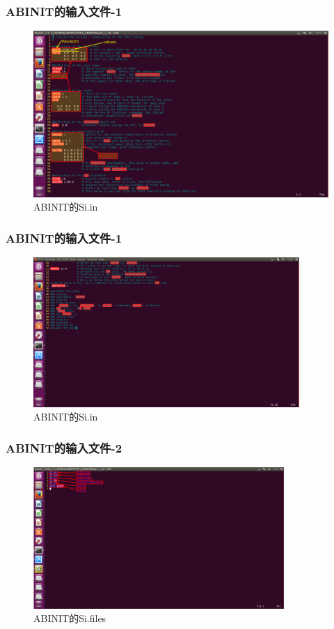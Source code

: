 \documentclass[cjk,slidestop,compress,mathserif,blue]{beamer}
\begin{document}
\frame
{
	\frametitle{ABINIT的输入文件-1}
\begin{figure}[h!]
\centering
\includegraphics[height=0.5487\textwidth,width=1.04\textwidth,viewport=70 20 900 432,clip]{Figures/2016-06-28_Si-1.png}
\caption{\textrm{ABINIT}的Si.in}
\label{X.in-2}
\end{figure}
}

\frame
{
	\frametitle{ABINIT的输入文件-1}
\begin{figure}[h!]
\centering
\includegraphics[height=0.5487\textwidth,width=0.90\textwidth,viewport=70 400 825 875,clip]{Figures/2016-06-28_Si-2.png}
\caption{\textrm{ABINIT}的Si.in}
\label{X.in-3}
\end{figure}
}

\frame
{
	\frametitle{ABINIT的输入文件-2}
\begin{figure}[h!]
\centering
\includegraphics[height=0.5524\textwidth,width=0.85\textwidth,viewport=70 600 475 875,clip]{Figures/2016-06-28_Si-3.png}
\caption{\textrm{ABINIT}的Si.files}
\label{X.files}
\end{figure}
}
\end{document}
